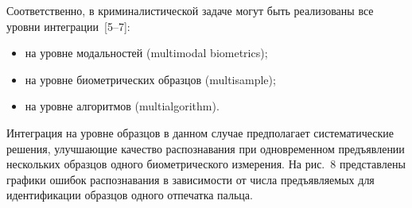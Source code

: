 \begin{multicols}{2}
  Соответственно, в криминалистической задаче могут быть реализованы все 
уровни интеграции~\mbox{[5--7]:}
  \begin{itemize}
\item на уровне модальностей (multimodal biometrics);
\item на уровне биометрических образцов (multisample);
\item на уровне алгоритмов (multialgorithm).
  \end{itemize}
  
  Интеграция на уровне образцов в данном случае предполагает 
систематические решения, улуч\-ша\-ющие качество распознавания при 
одновременном предъявлении нескольких образцов одного био\-мет\-ри\-че\-ско\-го 
измерения. На рис.~8 представлены графики ошибок распознавания 
в зависимости от чис\-ла предъявляемых для идентификации образцов одного 
отпечатка пальца.

\end{multicols}

\begin{figure*} %
\vspace*{1pt}
\begin{center}
\mbox{%
\epsfxsize=166.3mm  
 }
\end{center}
\vspace*{-9pt}
\begin{minipage}[t]{82mm}
\end{minipage}
\hfill
\begin{minipage}[t]{82mm} %
\end{minipage}
\vspace*{6pt}
\end{figure*}

 \begin{figure*} %
\vspace*{1pt}
\begin{center}
\mbox{%
\epsfxsize=143.132mm  
 }
\end{center}
\vspace*{-9pt}
  \end{figure*}
  
